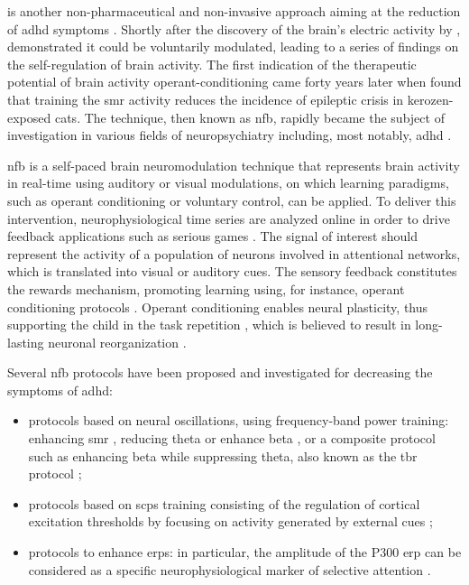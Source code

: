  is another non-pharmaceutical and non-invasive approach aiming at the reduction of \gls{adhd} symptoms 
\citep{Arns2015, Steffert2010, Marzbani2016}. Shortly after the discovery of the brain's electric activity by 
\citet{Berger1929}, \citet{Durup1935} demonstrated it could be voluntarily modulated, leading to a series of findings on the 
self-regulation of brain activity. The first indication of the therapeutic potential of brain activity operant-conditioning 
came forty years later when \citet{Sterman1974} found that training the \gls{smr} activity reduces the incidence 
of epileptic crisis in kerozen-exposed cats. The technique, then known as \gls{nfb}, rapidly became the subject of investigation in various 
fields of neuropsychiatry including, most notably, \gls{adhd} \citep{Lubar1976, Rossiter1995, Linden1996, Maurizio2014}.

\Gls{nfb} is a self-paced brain neuromodulation technique that represents brain activity in real-time using auditory 
or visual modulations, on which learning paradigms, such as operant conditioning
\citep{Reynolds1975} or voluntary control, can be applied. To deliver this intervention, neurophysiological time series 
are analyzed online in order to drive feedback applications such as serious games \citep{Wang2010}. 
The signal of interest should represent the activity of a population of neurons involved in attentional networks, which is translated into 
visual or auditory cues. The sensory feedback constitutes the rewards mechanism, promoting learning using, for instance, operant conditioning 
protocols \citep{Sherlin2011}. Operant conditioning enables neural plasticity, thus supporting the child in the task repetition \citep{Skinner1961}, 
which is believed to result in long-lasting neuronal reorganization \citep{VanDoren2017}. 

Several \gls{nfb} protocols have been proposed and investigated for decreasing the symptoms of \gls{adhd}:
\begin{itemize} 
  \item protocols based on neural oscillations, using frequency-band power training: enhancing \gls{smr} \citep{Beauregard2006}, reducing theta  
	  \citep{Marzbani2016} or enhance beta \citep{Kropotov2005}, or a composite protocol such as enhancing beta while suppressing theta, also known as the \gls{tbr}
    protocol \citep{Lubar1976, Arns2013}; 
  \item protocols based on \glspl{scp} training consisting of the regulation of
    cortical excitation thresholds by focusing on activity generated by external cues 
    \citep{Heinrich2004, Banaschewski2007}; 
  \item protocols to enhance \glspl{erp}: in particular, the amplitude of the P300 \gls{erp} can be considered as a specific
    neurophysiological marker of selective attention \citep{Fouillen2017}.  
\end{itemize} 

